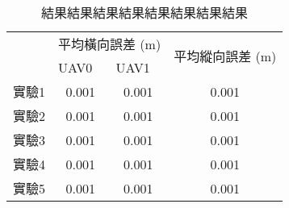 \begin{table}[H]
\centering
\caption{結果結果結果結果結果結果結果結果}
\label{t:sim30_5times}
\begin{tabularx}{\textwidth}{|c|X|X|c|}
\hline
\multirow{2}{*}{} & \multicolumn{2}{c|}{平均橫向誤差 (m)} & \multirow{2}{*}{平均縱向誤差 (m)} \\ \cline{2-3}
 & \multicolumn{1}{X|}{\centering UAV0} & \multicolumn{1}{X|}{\centering UAV1} &  \\ \hline
實驗1 & \multicolumn{1}{c|}{0.001} &  \multicolumn{1}{c|}{0.001} & 0.001 \\ \hline
實驗2 & \multicolumn{1}{c|}{0.001} &  \multicolumn{1}{c|}{0.001} & 0.001 \\ \hline
實驗3 & \multicolumn{1}{c|}{0.001} &  \multicolumn{1}{c|}{0.001} & 0.001 \\ \hline
實驗4 & \multicolumn{1}{c|}{0.001} &  \multicolumn{1}{c|}{0.001} & 0.001 \\ \hline
實驗5 & \multicolumn{1}{c|}{0.001} &  \multicolumn{1}{c|}{0.001} & 0.001 \\ \hline
\end{tabularx}
\end{table}
